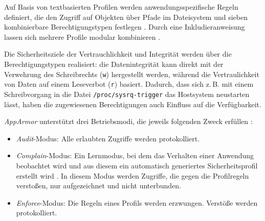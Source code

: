 \documentclass[../main.tex]{subfiles}
\begin{document}
				Auf Basis von textbasierten Profilen werden anwendungsspezifische Regeln definiert, die den Zugriff auf Objekten über Pfade im Dateisystem und sieben kombinierbare Berechtigungstypen festlegen \cite{linuxSecOverview}\cite{apparmorQuickProfileLanguage}. Durch eine Inkludieranweisung lassen sich mehrere Profile modular kombinieren \cite{apparmorQuickProfileLanguage}.

				Die Sicherheitsziele der Vertrauchlichkeit und Integrität werden über die Berechtigungstypen realisiert: die Datenintegrität kann direkt mit der Verwehrung des Schreibrechts (\texttt{w}) hergestellt werden, während die Vertraulichkeit von Daten auf einem Leseverbot (\texttt{r}) basiert. Dadurch, dass sich z.\,B. mit einem Schreibvorgang in die Datei \texttt{/proc/sysrq-trigger} das Hostsystem neustarten lässt, haben die zugewiesenen Berechtigungen auch Einfluss auf die Verfügbarkeit.


				\emph{AppArmor} unterstützt drei Betriebsmodi, die jeweils folgenden Zweck erfüllen \cite[S.82]{SELinuxApparmor}:
				\begin{itemize}
					\item \emph{Audit}-Modus: Alle erlaubten Zugriffe werden protokolliert.
					\item \emph{Complain}-Modus: Ein Lernmodus, bei dem das Verhalten einer Anwendung beobachtet wird und aus diesem ein automatisch generiertes Sicherheitsprofil erstellt wird \cite{linuxSecOverview}. In diesem Modus werden Zugriffe, die gegen die Profilregeln verstoßen, nur aufgezeichnet und nicht unterbunden.
					\item \emph{Enforce}-Modus: Die Regeln eines Profils werden erzwungen. Verstöße werden protokolliert.
				\end{itemize}

\end{document}
